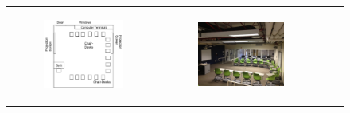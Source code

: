\documentclass[11pt,letterpaper]{article}
\begin{document}
\begin{figure}
{\begin{tabular}{cccc}
\begin{subfigure}[b]{0.18\textwidth}\includegraphics[width=\textwidth]{figures/classroom-u-shaped.pdf}\caption{}\label{fig:classroom-c}\end{subfigure}&
\begin{subfigure}[b]{0.18\textwidth}\includegraphics[width=\textwidth]{figures/classroom-u-photo.jpg}\caption{}\label{fig:classroom-d}\end{subfigure}\\

\end{tabular}}
\end{figure}
\end{document}
